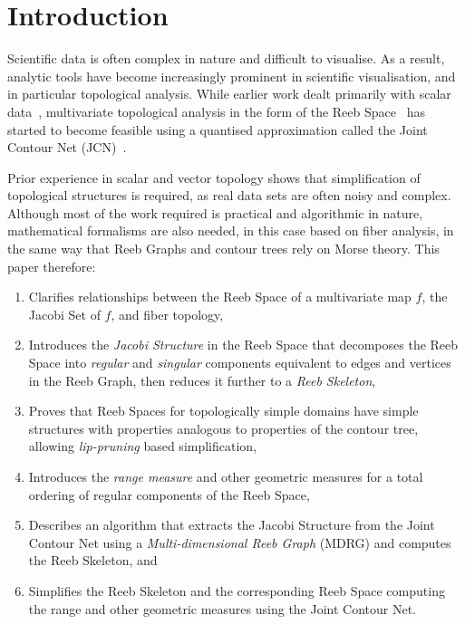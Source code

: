 \documentclass[twocolumn]{article}
\begin{document}
\section{Introduction} 
\label{sec:intro}
Scientific data is often complex in nature and difficult to visualise.  As a result, 
analytic tools have become increasingly prominent in scientific visualisation,
and in particular topological analysis.  While earlier work dealt primarily with
scalar data~\cite{2003-Chiang-Simplification, 2004-Carr-simplification, 2012-Tierny-tvcg}, 
multivariate topological analysis in the form of the Reeb
Space~\cite{2004-Saeki, 2008-edels-reebspace}
has started to become feasible using a quantised approximation called the Joint 
Contour Net (JCN)~\cite{2013-Carr-TVCG}.

Prior experience in scalar and vector topology shows that simplification of
topological structures is required, as real data sets are often noisy and 
complex.  Although most of the work required is practical and algorithmic in 
nature, mathematical formalisms are also needed, in this case based on fiber 
analysis, in the same way that Reeb Graphs and contour trees rely on Morse theory.
This paper therefore:
\begin{enumerate}\itemsep=.8pt
\item	Clarifies relationships between the Reeb Space of a multivariate map $f$, 
the Jacobi Set of $f$, and fiber topology,
\item	Introduces the \emph{Jacobi Structure} in the Reeb Space that decomposes the
Reeb Space into \emph{regular} and \emph{singular} components equivalent to edges and vertices
in the Reeb Graph, then reduces it further to a \textit{Reeb Skeleton}, 
\item	Proves that Reeb Spaces for topologically simple domains have simple structures
with properties analogous to properties of the contour tree, allowing
\emph{lip-pruning} based simplification,
\item	Introduces the \emph{range measure} and other geometric measures
  for a total ordering of regular components of the Reeb Space,
\item	Describes an algorithm that extracts the Jacobi Structure from the Joint Contour Net 
using a \textit{Multi-dimensional Reeb Graph} (MDRG) and computes the Reeb Skeleton, 
and
\item	Simplifies the Reeb Skeleton and the corresponding Reeb Space
  computing the range and other geometric measures using the Joint Contour Net. 
\end{enumerate}
\end{document}
